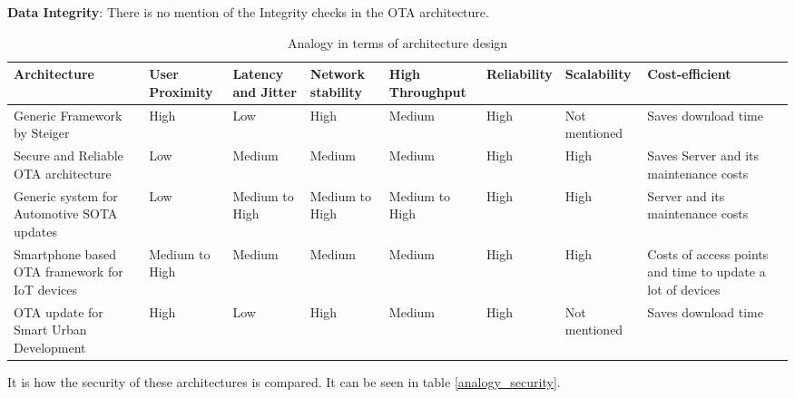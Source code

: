 \documentclass[12pt,a4paper]{article}
\begin{document}
{\textbf{Data Integrity}: There is no mention of the Integrity checks in the OTA architecture. \\


\newpage

\begin{landscape}
\begin{table}[h]
\footnotesize
\centering
\begin{tabular}{ |p{2.2cm}||p{2cm}|p{2cm}|p{2cm}| p{2cm}| p{2cm}| p{2cm}| p{2cm}| p{2.7cm}| }
 \hline
 Architecture&  User Proximity & Latency and Jitter & Network stability & High Throughput & Reliability & Scalability & Cost-efficient \\
 \hline
 Generic Framework by Steiger & High & Low & High & Medium & High & Not mentioned & Saves download time \\
 \hline
 Secure and Reliable OTA architecture & Low & Medium & Medium & Medium & High & High & Saves Server and its maintenance costs \\
 \hline
 Generic system for Automotive SOTA updates & Low & Medium to High & Medium to High & Medium to High & High & High & Server and its maintenance costs \\
 \hline
  Smartphone based OTA framework for IoT devices & Medium to High & Medium & Medium & Medium & High & High & Costs of access points and time to update a lot of devices \\
 \hline
 OTA update for Smart Urban Development & High & Low & High & Medium & High & Not mentioned & Saves download time \\
 \hline
 
\end{tabular}
\caption{ Analogy in terms of architecture design}
\label{analogy_design}
\end{table}

\end{landscape}

It is how the security of these architectures is compared. It can be seen in table \ref{analogy_security}.

}
\end{document}
